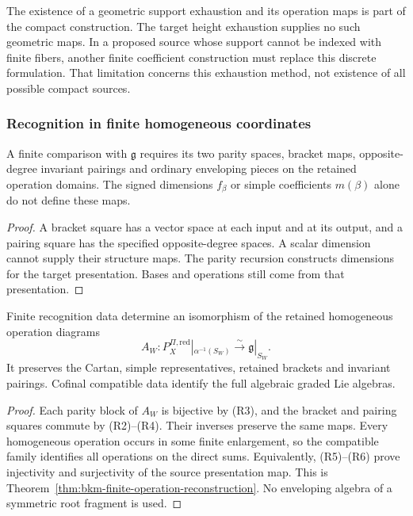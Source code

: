 The existence of a geometric support exhaustion and its operation
maps is part of the compact construction. The target height
exhaustion supplies no such geometric maps. In a proposed source
whose support cannot be indexed with finite fibers, another finite
coefficient construction must replace this discrete formulation.
That limitation concerns this exhaustion method, not existence of
all possible compact sources.

\subsubsection*{Recognition in finite homogeneous coordinates}

\begin{proposition}
\label{prop:target-presentation-prerequisite}
A finite comparison with $\mathfrak g$ requires its two parity
spaces, bracket maps, opposite-degree invariant pairings and
ordinary enveloping pieces on the retained operation domains.
The signed dimensions $f_\beta$ or simple coefficients $m(\beta)$
alone do not define these maps.
\end{proposition}
\begin{proof}
A bracket square has a vector space at each input and at its
output, and a pairing square has the specified opposite-degree
spaces. A scalar dimension cannot supply their structure maps.
The parity recursion constructs dimensions for the target
presentation. Bases and operations still come from that presentation.
\end{proof}

\begin{proposition}
\label{prop:finite-window-presentation-recognition}
Finite recognition data determine an isomorphism of the retained
homogeneous operation diagrams
\[
 A_W:P_X^{\Pi,\mathrm{red}}|_{\alpha^{-1}(S_W)}
       \xrightarrow{\sim}\mathfrak g|_{S_W}.
\]
It preserves the Cartan, simple representatives, retained brackets
and invariant pairings. Cofinal compatible data identify the full
algebraic graded Lie algebras.
\end{proposition}
\begin{proof}
Each parity block of $A_W$ is bijective by (R3), and the bracket
and pairing squares commute by (R2)--(R4). Their inverses preserve
the same maps. Every homogeneous operation occurs in some finite
enlargement, so the compatible family identifies all operations
on the direct sums. Equivalently, (R5)--(R6) prove injectivity and
surjectivity of the source presentation map. This is
Theorem~\ref{thm:bkm-finite-operation-reconstruction}. No enveloping
algebra of a symmetric root fragment is used.
\end{proof}

